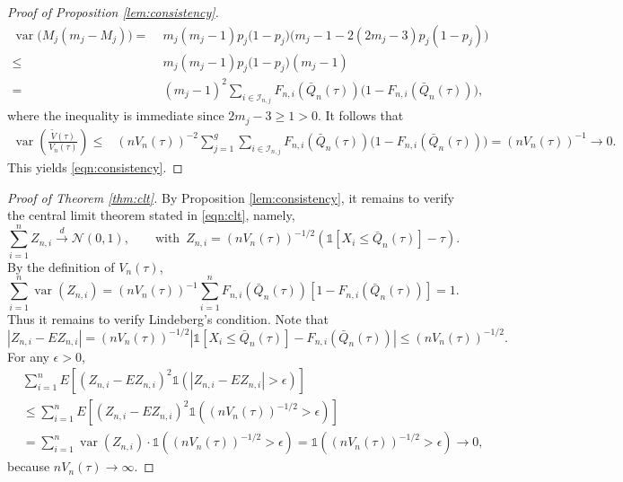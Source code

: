 \documentclass[12pt]{article}
\theoremstyle{remark}
\newcommand{\var}{\operatorname{var}}
\begin{document}
\begin{proof}[Proof of Proposition \ref{lem:consistency}]
\begin{align*}
\operatorname{var}\bigl(M_j(m_j-M_j)\bigr)
=&\; m_j(m_j-1)p_j\bigl(1-p_j\bigr)\bigl(m_j-1-2(2m_j-3)p_j(1-p_j)\bigr)\\
\leq&\; m_j(m_j-1)p_j\bigl(1-p_j\bigr)(m_j-1)\\
=&\; (m_j-1)^2 \sum_{i\in \mathcal{I}_{n,j}} F_{n,i}(\bar{Q}_{n}(\tau))\bigl(1-F_{n,i}(\bar{Q}_{n}(\tau))\bigr),
\end{align*}
where the inequality is immediate since $2m_j-3\geq 1>0$. It follows that
	\begin{align*}
		\var\left(\frac{\widetilde{V}(\tau)}{V_n(\tau)} \right)
		\leq& (nV_n(\tau))^{-2}\sum_{j=1}^{g}\sum_{i\in \mathcal{I}_{n,j}}F_{n,i}(\bar{Q}_{n}(\tau))\bigl(1- F_{n,i}(\bar{Q}_{n}(\tau))\bigr)
		= (nV_n(\tau))^{-1}\rightarrow 0.
        \end{align*}
This  yields \eqref{eqn:consistency}. 
\end{proof}

\begin{proof}[Proof of Theorem \ref{thm:clt}]
By Proposition \ref{lem:consistency}, it remains to verify the central limit theorem stated in \eqref{eqn:clt}, namely,
\begin{equation*}
    \sum_{i=1}^{n} Z_{n,i} \xrightarrow{d} \mathcal{N}(0,1), 
    \qquad \mbox{with } \,
    Z_{n,i}= (nV_n(\tau))^{-1/2}\left(\mathds{1}[X_i \leq \bar{Q}_n(\tau)] - \tau\right).
\end{equation*}
By the definition of $V_n(\tau)$,
\begin{equation*}
\sum_{i=1}^{n} \var(Z_{n,i})
= (nV_n(\tau))^{-1} \sum_{i=1}^{n} F_{n,i}(\bar{Q}_n(\tau))\left[1 - F_{n,i}(\bar{Q}_n(\tau))\right]
= 1.
\end{equation*}
Thus it remains to verify Lindeberg's condition. Note that
\begin{equation*}
    \left|Z_{n,i} - E Z_{n,i}\right|
    = (nV_n(\tau))^{-1/2}
      \left|\mathds{1}[X_i \leq \bar{Q}_n(\tau)] - F_{n,i}(\bar{Q}_n(\tau))\right|
    \leq (nV_n(\tau))^{-1/2}.
\end{equation*}
For any $\epsilon > 0$,
\begin{align*}
    &\sum_{i=1}^{n} 
    E\left[\left(Z_{n,i} - E Z_{n,i}\right)^2 
      \mathds{1}\left(\left|Z_{n,i} - E Z_{n,i}\right| > \epsilon\right)\right]\\
    &\leq 
    \sum_{i=1}^{n} 
    E\left[\left(Z_{n,i} - E Z_{n,i}\right)^2
      \mathds{1}\left((nV_n(\tau))^{-1/2} > \epsilon\right)\right] \\
    &= 
    \sum_{i=1}^{n} \var(Z_{n,i})\cdot\mathds{1}\left((nV_n(\tau))^{-1/2} > \epsilon\right)
    =\mathds{1}\left((nV_n(\tau))^{-1/2} > \epsilon\right)\rightarrow 0,
\end{align*}
because $nV_n(\tau) \to \infty$. %
\end{proof}
\end{document}
